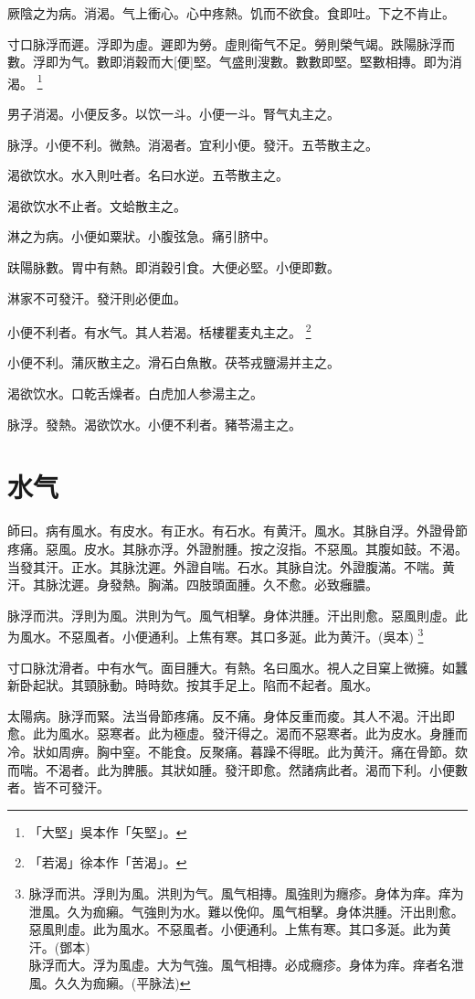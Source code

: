 \documentclass[oneside,b4paper]{ctexbook}
\begin{document}
\begin{flushleft}
厥陰之为病。消渴。气上衝心。心中疼熱。饥而不欲食。食即吐。下之不肯止。

寸口脉浮而遲。浮即为虛。遲即为勞。虛則衛气不足。勞則榮气竭。跌陽脉浮而數。浮即为气。數即消穀而大[便]堅。气盛則溲數。數數即堅。堅數相摶。即为消渴。
\footnote{「大堅」吳本作「矢堅」。}

男子消渴。小便反多。以饮一斗。小便一斗。腎气丸主之。

脉浮。小便不利。微熱。消渴者。宜利小便。發汗。五苓散主之。

渴欲饮水。水入則吐者。名曰水逆。五苓散主之。

渴欲饮水不止者。文蛤散主之。

淋之为病。小便如粟狀。小腹弦急。痛引脐中。

趺陽脉數。胃中有熱。即消穀引食。大便必堅。小便即數。

淋家不可發汗。發汗則必便血。

小便不利者。有水气。其人若渴。栝樓瞿麦丸主之。
\footnote{「若渴」徐本作「苦渴」。}

小便不利。蒲灰散主之。滑石白魚散。茯苓戎鹽湯并主之。

渴欲饮水。口乾舌燥者。白虎加人参湯主之。

脉浮。發熱。渴欲饮水。小便不利者。豬苓湯主之。

\chapter{水气}

師曰。病有風水。有皮水。有正水。有石水。有黄汗。風水。其脉自浮。外證骨節疼痛。惡風。皮水。其脉亦浮。外證胕腫。按之沒指。不惡風。其腹如鼓。不渴。当發其汗。正水。其脉沈遲。外證自喘。石水。其脉自沈。外證腹滿。不喘。黄汗。其脉沈遲。身發熱。胸滿。四肢頭面腫。久不愈。必致癰膿。

脉浮而洪。浮則为風。洪則为气。風气相擊。身体洪腫。汗出則愈。惡風則虛。此为風水。不惡風者。小便通利。上焦有寒。其口多涎。此为黄汗。(吳本)
\footnote{脉浮而洪。浮則为風。洪則为气。風气相摶。風強則为癮疹。身体为痒。痒为泄風。久为痂癩。气強則为水。難以俛仰。風气相擊。身体洪腫。汗出則愈。惡風則虛。此为風水。不惡風者。小便通利。上焦有寒。其口多涎。此为黄汗。(鄧本)\\脉浮而大。浮为風虛。大为气強。風气相摶。必成癮疹。身体为痒。痒者名泄風。久久为痂癩。(平脉法)}

寸口脉沈滑者。中有水气。面目腫大。有熱。名曰風水。視人之目窠上微擁。如蠶新卧起狀。其頸脉動。時時欬。按其手足上。陷而不起者。風水。

太陽病。脉浮而緊。法当骨節疼痛。反不痛。身体反重而痠。其人不渴。汗出即愈。此为風水。惡寒者。此为極虛。發汗得之。渴而不惡寒者。此为皮水。身腫而冷。狀如周痹。胸中窒。不能食。反聚痛。暮躁不得眠。此为黄汗。痛在骨節。欬而喘。不渴者。此为脾脹。其狀如腫。發汗即愈。然諸病此者。渴而下利。小便數者。皆不可發汗。


\end{flushleft}
\end{document}
